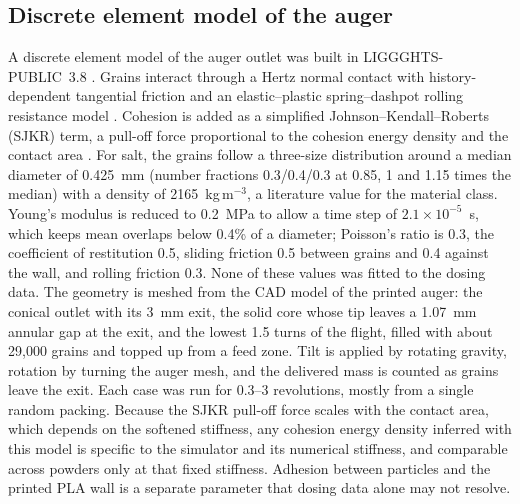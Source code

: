 \documentclass[preprint,12pt]{elsarticle}
\begin{document}
\subsection{Discrete element model of the auger}
\label{sec:dem}

A discrete element model of the auger outlet was built in LIGGGHTS-PUBLIC~3.8 \cite{Kloss2012Models,Cundall1979Discrete}. Grains interact through a Hertz normal contact with history-dependent tangential friction and an elastic--plastic spring--dashpot rolling resistance model \cite{Ai2011Assessment}. Cohesion is added as a simplified Johnson--Kendall--Roberts (SJKR) term, a pull-off force proportional to the cohesion energy density and the contact area \cite{Johnson1971Surface}. For salt, the grains follow a three-size distribution around a median diameter of 0.425~mm (number fractions 0.3/0.4/0.3 at 0.85, 1 and 1.15 times the median) with a density of 2165~kg\,m$^{-3}$, a literature value for the material class. Young's modulus is reduced to 0.2~MPa to allow a time step of $2.1\times10^{-5}$~s, which keeps mean overlaps below 0.4\% of a diameter; Poisson's ratio is 0.3, the coefficient of restitution 0.5, sliding friction 0.5 between grains and 0.4 against the wall, and rolling friction 0.3. None of these values was fitted to the dosing data. The geometry is meshed from the CAD model of the printed auger: the conical outlet with its 3~mm exit, the solid core whose tip leaves a 1.07~mm annular gap at the exit, and the lowest 1.5 turns of the flight, filled with about 29{,}000 grains and topped up from a feed zone. Tilt is applied by rotating gravity, rotation by turning the auger mesh, and the delivered mass is counted as grains leave the exit. Each case was run for 0.3--3 revolutions, mostly from a single random packing. Because the SJKR pull-off force scales with the contact area, which depends on the softened stiffness, any cohesion energy density inferred with this model is specific to the simulator and its numerical stiffness, and comparable across powders only at that fixed stiffness. Adhesion between particles and the printed PLA wall is a separate parameter that dosing data alone may not resolve.
\end{document}
